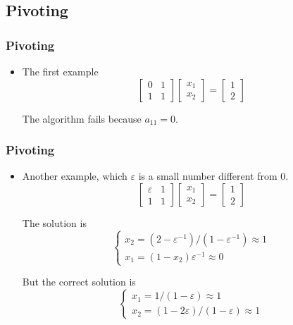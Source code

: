 \documentclass[notheorems,mathserif,table,compress]{beamer}  %
\begin{document}
\subsection{Pivoting}

\begin{frame}
\frametitle{Pivoting} 
\begin{itemize}
\item The first example
\begin{displaymath}
\begin{bmatrix}
0 & 1\\
1 & 1
\end{bmatrix}
\begin{bmatrix}
x_1\\
x_2
\end{bmatrix}=
\begin{bmatrix}
1\\
2
\end{bmatrix}
\end{displaymath}

The algorithm fails because $a_{11}=0$. 
\end{itemize}
\end{frame}

\begin{frame}
\frametitle{Pivoting} 
\begin{itemize}
\item Another example, which $\varepsilon$ is a small number different from 0.
\begin{displaymath}
\begin{bmatrix}
\varepsilon & 1\\
1 & 1
\end{bmatrix}
\begin{bmatrix}
x_1\\
x_2
\end{bmatrix}=
\begin{bmatrix}
1\\
2
\end{bmatrix}
\end{displaymath}

The solution is 
\begin{displaymath}
\left\{ \begin{array}{ll}
x_2=(2-\varepsilon^{-1})/(1-\varepsilon^{-1})\approx 1\\
x_1=(1-x_2)\varepsilon^{-1}\approx 0
\end{array} \right.
\end{displaymath}

But the correct solution is 
\begin{displaymath}
\left\{ \begin{array}{ll}
x_1=1/(1-\varepsilon)\approx 1\\
x_2=(1-2\varepsilon)/(1-\varepsilon)\approx 1
\end{array} \right.
\end{displaymath}

\end{itemize}
\end{frame}
\end{document}
